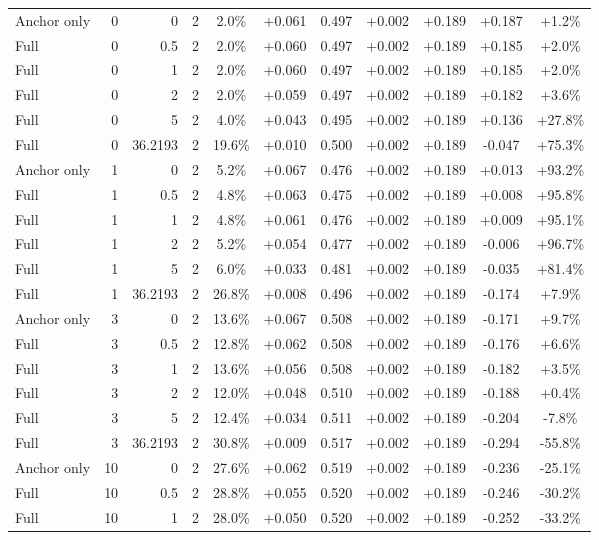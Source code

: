 \begin{table}[htbp]
\begin{tabular}{lrrrccccccc}
Anchor only & 0 & 0 & 2 & 2.0\% & +0.061 & 0.497 & +0.002 & +0.189 & +0.187 & +1.2\% \\
Full & 0 & 0.5 & 2 & 2.0\% & +0.060 & 0.497 & +0.002 & +0.189 & +0.185 & +2.0\% \\
Full & 0 & 1 & 2 & 2.0\% & +0.060 & 0.497 & +0.002 & +0.189 & +0.185 & +2.0\% \\
Full & 0 & 2 & 2 & 2.0\% & +0.059 & 0.497 & +0.002 & +0.189 & +0.182 & +3.6\% \\
Full & 0 & 5 & 2 & 4.0\% & +0.043 & 0.495 & +0.002 & +0.189 & +0.136 & +27.8\% \\
Full & 0 & 36.2193 & 2 & 19.6\% & +0.010 & 0.500 & +0.002 & +0.189 & -0.047 & +75.3\% \\
Anchor only & 1 & 0 & 2 & 5.2\% & +0.067 & 0.476 & +0.002 & +0.189 & +0.013 & +93.2\% \\
Full & 1 & 0.5 & 2 & 4.8\% & +0.063 & 0.475 & +0.002 & +0.189 & +0.008 & +95.8\% \\
Full & 1 & 1 & 2 & 4.8\% & +0.061 & 0.476 & +0.002 & +0.189 & +0.009 & +95.1\% \\
Full & 1 & 2 & 2 & 5.2\% & +0.054 & 0.477 & +0.002 & +0.189 & -0.006 & +96.7\% \\
Full & 1 & 5 & 2 & 6.0\% & +0.033 & 0.481 & +0.002 & +0.189 & -0.035 & +81.4\% \\
Full & 1 & 36.2193 & 2 & 26.8\% & +0.008 & 0.496 & +0.002 & +0.189 & -0.174 & +7.9\% \\
Anchor only & 3 & 0 & 2 & 13.6\% & +0.067 & 0.508 & +0.002 & +0.189 & -0.171 & +9.7\% \\
Full & 3 & 0.5 & 2 & 12.8\% & +0.062 & 0.508 & +0.002 & +0.189 & -0.176 & +6.6\% \\
Full & 3 & 1 & 2 & 13.6\% & +0.056 & 0.508 & +0.002 & +0.189 & -0.182 & +3.5\% \\
Full & 3 & 2 & 2 & 12.0\% & +0.048 & 0.510 & +0.002 & +0.189 & -0.188 & +0.4\% \\
Full & 3 & 5 & 2 & 12.4\% & +0.034 & 0.511 & +0.002 & +0.189 & -0.204 & -7.8\% \\
Full & 3 & 36.2193 & 2 & 30.8\% & +0.009 & 0.517 & +0.002 & +0.189 & -0.294 & -55.8\% \\
Anchor only & 10 & 0 & 2 & 27.6\% & +0.062 & 0.519 & +0.002 & +0.189 & -0.236 & -25.1\% \\
Full & 10 & 0.5 & 2 & 28.8\% & +0.055 & 0.520 & +0.002 & +0.189 & -0.246 & -30.2\% \\
Full & 10 & 1 & 2 & 28.0\% & +0.050 & 0.520 & +0.002 & +0.189 & -0.252 & -33.2\% \\

\end{tabular}
\end{table}

